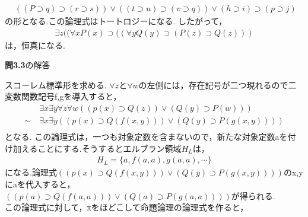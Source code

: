 \documentclass[11pt,dvipdfmx]{jreport}
\begin{document}
\begin{enumerate}
\begin{equation*}
  \begin{array}{lll}
    & ((P \supset q) \supset (r \supset s)) \lor ((t \supset u) \supset (v \supset q)) \lor (h \supset i) \supset (p \supset j)& 
  \end{array}
\end{equation*}
の形となる.この論理式はトートロジーになる.
したがって，
 \begin{equation*}
    \begin{array}{lll}
      & \exists z (( \forall x P(x) \supset ((\forall y  Q(y) \supset (P(z) \supset Q(z))) & 
    \end{array}
  \end{equation*}
は，恒真になる.

\end{enumerate}

\vspace{3mm}

\noindent \textbf{問3.3}の解答 
\par
\vspace{3mm}
スコーレム標準形を求める.
$\forall z$と$\forall w$の左側には，存在記号が二つ現れるので二変数関数記号f,gを導入すると，\\
\renewcommand{\labelenumi}{\arabic{enumi}) }
  \begin{equation*}
  \begin{array}{lll}
   & \exists x \exists y \forall z \forall w ((p(x) \supset Q(z)) \lor (Q(y)\supset P(w)))\\
    \sim \ & \exists x \exists y ((p(x) \supset Q(f(x,y))) \lor (Q(y)\supset P(g(x,y))))\\
  \end{array}
  \end{equation*}
となる.
この論理式は，一つも対象定数を含まないので，新たな対象定数aを付け加えることにする.そうするとエルブラン領域$H_L$は，\\
\begin{equation*}
  \begin{array}{lll}
    & H_L = \{a,f(a,a),g(a,a),\cdots \} & 
  \end{array}
\end{equation*}
になる.論理式$((p(x) \supset Q(f(x,y))) \lor (Q(y)\supset P(g(x,y))))$のx,yにaを代入すると，
$((p(a) \supset Q(f(a,a))) \lor (Q(a)\supset P(g(a,a))))$が得られる.\\
この論理式に対して，πをほどこして命題論理の論理式を作ると，
\end{document}
